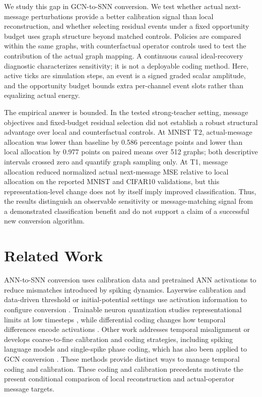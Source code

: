 \documentclass{article}
\begin{document}
We study this gap in GCN-to-SNN conversion. We test whether actual next-message perturbations provide a better calibration signal than local reconstruction, and whether selecting residual events under a fixed opportunity budget uses graph structure beyond matched controls. Policies are compared within the same graphs, with counterfactual operator controls used to test the contribution of the actual graph mapping. A continuous causal ideal-recovery diagnostic characterizes sensitivity; it is not a deployable coding method. Here, active ticks are simulation steps, an event is a signed graded scalar amplitude, and the opportunity budget bounds extra per-channel event slots rather than equalizing actual energy.

The empirical answer is bounded. In the tested strong-teacher setting, message objectives and fixed-budget residual selection did not establish a robust structural advantage over local and counterfactual controls. At MNIST T2, actual-message allocation was lower than baseline by 0.586 percentage points and lower than local allocation by 0.977 points on paired means over 512 graphs; both descriptive intervals crossed zero and quantify graph sampling only. At T1, message allocation reduced normalized actual next-message MSE relative to local allocation on the reported MNIST and CIFAR10 validations, but this representation-level change does not by itself imply improved classification. Thus, the results distinguish an observable sensitivity or message-matching signal from a demonstrated classification benefit and do not support a claim of a successful new conversion algorithm.

\section{Related Work}

\label{sec:related_work}

ANN-to-SNN conversion uses calibration data and pretrained ANN activations to reduce mismatches introduced by spiking dynamics. Layerwise calibration and data-driven threshold or initial-potential settings use activation information to configure conversion \cite{li2021, bojkovic2024}. Trainable neuron quantization studies representational limits at low timesteps \cite{atif2023}, while differential coding changes how temporal differences encode activations \cite{huang2025}. Other work addresses temporal misalignment \cite{bojkovic2025} or develops coarse-to-fine calibration and coding strategies, including spiking language models \cite{fas2025} and single-spike phase coding, which has also been applied to GCN conversion \cite{onespike2024}. These methods provide distinct ways to manage temporal coding and calibration. These coding and calibration precedents motivate the present conditional comparison of local reconstruction and actual-operator message targets.
\end{document}
